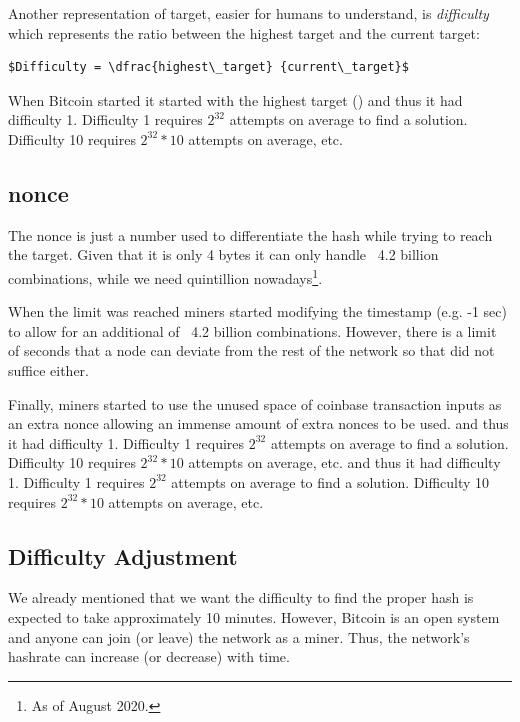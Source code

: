 Another representation of target, easier for humans to understand, is \emph{difficulty} which represents the ratio between the highest target and the current target:

\begin{emphbox}
\begin{lstlisting}[style=Pseudomath]
$Difficulty = \dfrac{highest\_target} {current\_target}$
\end{lstlisting}
\end{emphbox}

When Bitcoin started it started with the highest target () and thus it had difficulty 1. Difficulty 1 requires $2^{32}$ attempts on average to find a solution. Difficulty 10 requires $2^{32} * 10$ attempts on average, etc.

\subsection*{nonce}
The nonce is just a number used to differentiate the hash while trying to reach the target. Given that it is only 4 bytes it can only handle ~4.2 billion combinations, while we need quintillion nowadays\footnote{As of August 2020.}.

When the limit was reached miners started modifying the timestamp (e.g. -1 sec) to allow for an additional of ~4.2 billion combinations. However, there is a limit of seconds that a node can deviate from the rest of the network so that did not suffice either.

Finally, miners started to use the unused space of coinbase transaction inputs as an extra nonce allowing an immense amount of extra nonces to be used. and thus it had difficulty 1. Difficulty 1 requires $2^{32}$ attempts on average to find a solution. Difficulty 10 requires $2^{32} * 10$ attempts on average, etc. and thus it had difficulty 1. Difficulty 1 requires $2^{32}$ attempts on average to find a solution. Difficulty 10 requires $2^{32} * 10$ attempts on average, etc.


\subsection*{Difficulty Adjustment}
We already mentioned that we want the difficulty to find the proper hash is expected to take approximately 10 minutes. However, Bitcoin is an open system and anyone can join (or leave) the network as a miner. Thus, the network’s hashrate can increase (or decrease) with time. 

